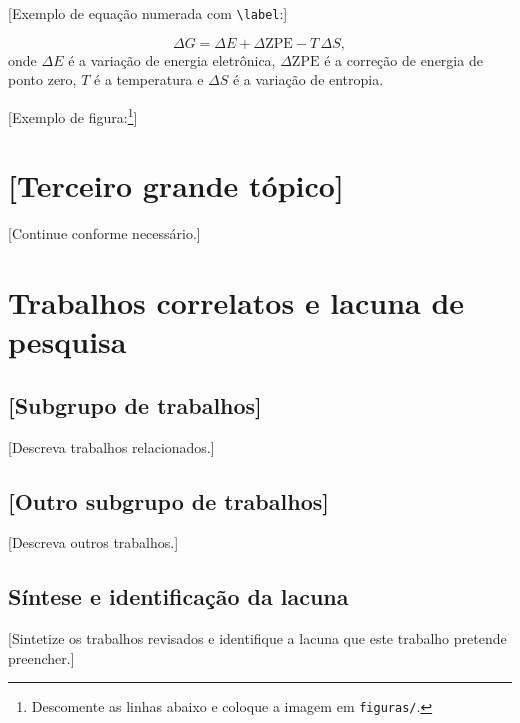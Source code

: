 [Exemplo de equação numerada com \texttt{\textbackslash label}:]

\begin{equation}
    \Delta G = \Delta E + \Delta \mathrm{ZPE} - T\,\Delta S,
    \label{eq:deltaG}
\end{equation}
onde $\Delta E$ é a variação de energia eletrônica, $\Delta\mathrm{ZPE}$
é a correção de energia de ponto zero, $T$ é a temperatura e $\Delta S$
é a variação de entropia.

[Exemplo de figura:\footnote{Descomente as linhas abaixo e coloque a
imagem em \texttt{figuras/}.}]


\section{[Terceiro grande tópico]}
\label{sec:topico-3}

[Continue conforme necessário.]

\section{Trabalhos correlatos e lacuna de pesquisa}
\label{sec:correlatos}

\subsection{[Subgrupo de trabalhos]}
\label{sec:correlatos-1}

[Descreva trabalhos relacionados.]

\subsection{[Outro subgrupo de trabalhos]}
\label{sec:correlatos-2}

[Descreva outros trabalhos.]

\subsection{Síntese e identificação da lacuna}
\label{sec:lacuna}

[Sintetize os trabalhos revisados e identifique a lacuna que
este trabalho pretende preencher.]
